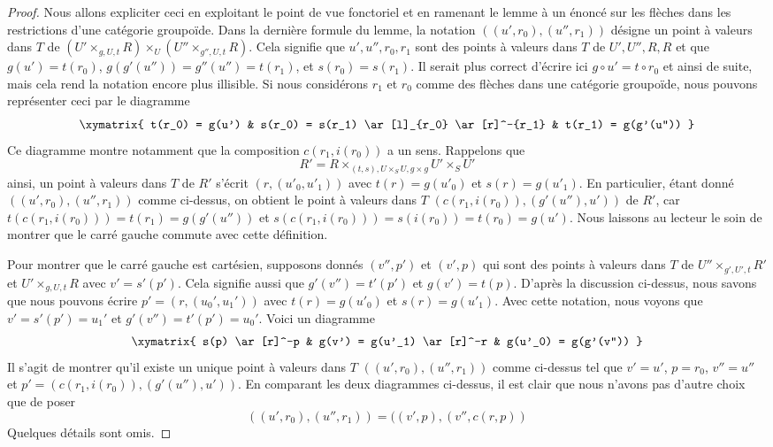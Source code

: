\begin{proof}
Nous allons expliciter ceci en exploitant le point de vue fonctoriel
et en ramenant le lemme à un énoncé sur les flèches dans les restrictions
d'une catégorie groupoïde. Dans la dernière formule du lemme, la
notation $((u', r_0), (u'', r_1))$ désigne un point à valeurs dans $T$ de
$(U' \times_{g, U, t} R) \times_U (U'' \times_{g'', U, t} R)$.
Cela signifie que $u', u'', r_0, r_1$ sont des points à valeurs dans $T$ de $U', U'', R, R$
et que $g(u') = t(r_0)$, $g(g'(u'')) = g''(u'') = t(r_1)$, et
$s(r_0) = s(r_1)$. Il serait plus correct d'écrire ici
$g \circ u' = t \circ r_0$ et ainsi de suite, mais cela rend la notation
encore plus illisible. Si nous considérons $r_1$ et $r_0$ comme des flèches dans
une catégorie groupoïde, nous pouvons représenter ceci par le diagramme
$$
\xymatrix{
t(r_0) = g(u') &
s(r_0) = s(r_1) \ar[l]_{r_0} \ar[r]^-{r_1} &
t(r_1) = g(g'(u''))
}
$$
Ce diagramme montre notamment que la composition
$c(r_1, i(r_0))$ a un sens. Rappelons que
$$
R' = R \times_{(t, s), U \times_S U, g \times g} U' \times_S U'
$$
ainsi, un point à valeurs dans $T$ de $R'$ s'écrit $(r, (u'_0, u'_1))$
avec $t(r) = g(u'_0)$ et $s(r) = g(u'_1)$. En particulier, étant donné
$((u', r_0), (u'', r_1))$ comme ci-dessus, on obtient le point à valeurs dans $T$
$(c(r_1, i(r_0)), (g'(u''), u'))$ de $R'$, car
$t(c(r_1, i(r_0))) = t(r_1) = g(g'(u''))$ et
$s(c(r_1, i(r_0))) = s(i(r_0)) = t(r_0) = g(u')$.
Nous laissons au lecteur le soin de montrer que le carré gauche commute
avec cette définition.

\medskip\noindent
Pour montrer que le carré gauche est cartésien,
supposons donnés $(v'', p')$ et $(v', p)$ qui sont des points à valeurs dans $T$ de
$U'' \times_{g', U', t} R'$ et $U' \times_{g, U, t} R$ avec
$v' = s'(p')$. Cela signifie aussi que $g'(v'') = t'(p')$ et
$g(v') = t(p)$. D'après la discussion ci-dessus, nous savons que nous pouvons écrire
$p' = (r, (u_0', u_1'))$ avec $t(r) = g(u'_0)$ et
$s(r) = g(u'_1)$. Avec cette notation, nous voyons que
$v' = s'(p') = u_1'$ et
$g'(v'') = t'(p') = u_0'$. Voici un diagramme
$$
\xymatrix{
s(p) \ar[r]^-p &
g(v') = g(u'_1) \ar[r]^-r &
g(u'_0) = g(g'(v''))
}
$$
Il s'agit de montrer qu'il existe un unique point à valeurs dans $T$
$((u', r_0), (u'', r_1))$ comme ci-dessus tel que
$v' = u'$, $p = r_0$, $v'' = u''$ et $p' = (c(r_1, i(r_0)), (g'(u''), u'))$.
En comparant les deux diagrammes ci-dessus, il est clair que nous n'avons pas d'autre choix
que de poser
$$
((u', r_0), (u'', r_1)) = ((v', p), (v'', c(r, p))
$$
Quelques détails sont omis.
\end{proof}

